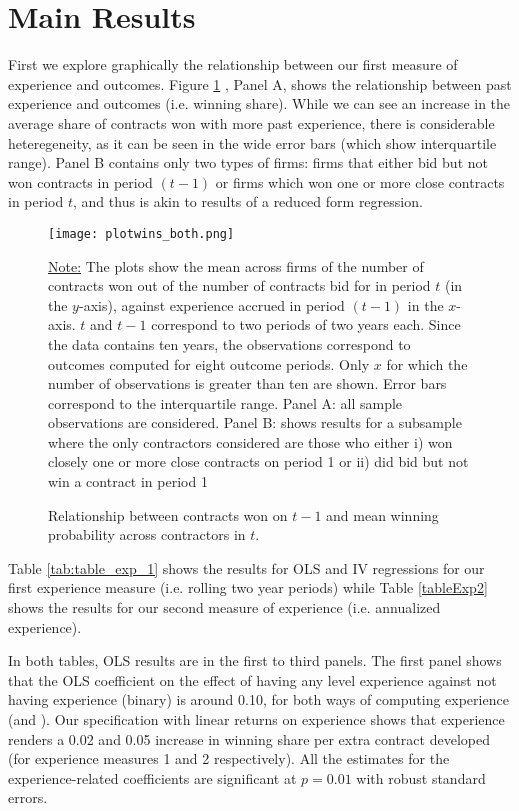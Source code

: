 \section{Main Results}

First we explore graphically the relationship between our first measure of experience and outcomes. Figure \ref{fig:plotresults_both} , Panel A, shows the relationship between past experience and outcomes (i.e. winning share). While we can see an increase in the average share of contracts won with more past experience, there is considerable heteregeneity, as it can be seen in the wide error bars (which show interquartile range). Panel B contains only two types of firms: firms that either bid but not won contracts in period $(t-1)$ or firms which won one or more close contracts in period $t$, and thus is akin to results of a reduced form regression.

\begin{figure}
  \texttt{[image: plotwins\_both.png]}
  \caption{Relationship between contracts won on $t-1$ and mean winning probability across contractors in $t$.}
  \label{fig:plotresults_both}
  \vskip 0.5mm
  { \footnotesize \underline{Note:} The plots show the mean across firms of the number of contracts won out of the number of contracts bid for in period $t$ (in the $y$-axis), against experience accrued in period $(t-1)$ in the $x$-axis. $t$ and $t-1$ correspond to two periods of two years each. Since the data contains ten years, the observations correspond to outcomes computed for eight outcome periods.  Only $x$ for which the number of observations is greater than ten are shown. Error bars correspond to the interquartile range. Panel A: all sample observations are considered. Panel B:  shows results for a subsample where the only contractors considered are those who either i) won closely one or more close contracts  on period 1 or ii) did bid but not win a contract in period 1\par}
\end{figure}

Table \ref{tab:table_exp_1} shows the results for OLS and IV regressions for our first experience measure (i.e. rolling two year periods) while Table \ref{tableExp2} shows the results for our second measure of experience (i.e. annualized experience).

In both tables, OLS results are in the first to third panels. The first panel shows that the OLS coefficient on the effect of having any level experience against not having experience (binary) is around 0.10, for both ways of computing experience (and ). Our specification with linear returns on experience shows that experience renders a 0.02 and 0.05 increase in winning share per extra contract developed (for experience measures 1 and 2 respectively). All the estimates for the experience-related coefficients are significant at $p=0.01$ with robust standard errors.

